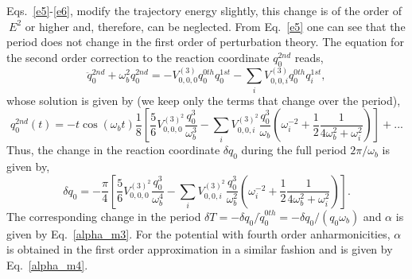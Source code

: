 \documentclass[journal=jpcafh,manuscript=article]{achemso}
\begin{document}
Eqs.~\ref{e5}-\ref{e6}, modify the trajectory energy slightly, this
change is of the order of $~E^2$ or higher and, therefore, can be neglected.
From Eq.~\ref{e5} one can see that the period does not change in the
first order of perturbation theory. The equation for the second order correction
to the reaction coordinate $q_0^{2nd}$ reads,
\begin{equation}
  \label{eq7}
  \ddot{q}_0^{2nd}+\omega_b^2q^{2nd}_0=-V_{0,0,0}^{(3)}q_0^{0th}q_0^{1st}-\sum_iV_{0,0,i}^{(3)}q_0^{0th}q_i^{1st},
\end{equation}
whose solution is given by (we keep only the terms that change over the
period),
\begin{equation}
  \label{e8}
  q_0^{2nd}(t)=- t\cos(\omega_bt)\frac{1}{8}\left[\frac{5}{6}V_{0,0,0}^{(3)^2}\frac{q_0^3}{\omega_b^3}
    -\sum_iV_{0,0,i}^{(3)^2}\frac{q_0^3}{\omega_b}\left(\omega_i^{-2}
      +\frac{1}{2}\frac{1}{4\omega_b^2+\omega_i^2}\right)\right]+...
\end{equation}
Thus, the change in the reaction coordinate $\delta q_0$ during the full period
$2\pi/\omega_b$ is given by,
\begin{equation}
  \label{e9}
  \delta q_0=-\frac{\pi}{4}\left[\frac{5}{6}V_{0,0,0}^{(3)^2}\frac{q_0^3}{\omega_b^4}
    -\sum_iV_{0,0,i}^{(3)^2}\frac{q_0^3}{\omega_b^2}\left(\omega_i^{-2}
      +\frac{1}{2}\frac{1}{4\omega_b^2+\omega_i^2}\right)\right].
\end{equation}
The corresponding change in the period
$\delta T=-\delta q_0/\dot{q}_0^{0th}=-\delta q_0/(q_0\omega_b)$ and
$\alpha$ is given by Eq.~\ref{alpha_m3}.  For the potential with
fourth order anharmonicities, $\alpha$ is obtained in the first order
approximation in a similar fashion and is given by Eq.~\ref{alpha_m4}.
\end{document}
